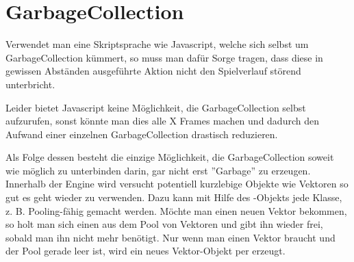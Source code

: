 \chapter{GarbageCollection}

Verwendet man eine Skriptsprache wie Javascript, welche sich selbst um GarbageCollection kümmert, so muss man dafür Sorge tragen, dass diese in gewissen Abständen ausgeführte Aktion nicht den Spielverlauf störend unterbricht.

Leider bietet Javascript keine Möglichkeit, die GarbageCollection selbst aufzurufen, sonst könnte man dies alle X Frames machen und dadurch den Aufwand einer einzelnen GarbageCollection drastisch reduzieren.

Als Folge dessen besteht die einzige Möglichkeit, die GarbageCollection soweit wie möglich zu unterbinden darin, gar nicht erst ''Garbage'' zu erzeugen. Innerhalb der Engine wird versucht potentiell kurzlebige Objekte wie Vektoren so gut es geht wieder zu verwenden. Dazu kann mit Hilfe des -Objekts jede Klasse, z. B.  Pooling-fähig gemacht werden. Möchte man einen neuen Vektor bekommen, so holt man sich einen aus dem Pool von Vektoren und gibt ihn wieder frei, sobald man ihn nicht mehr benötigt. Nur wenn man einen Vektor braucht und der Pool gerade leer ist, wird ein neues Vektor-Objekt per  erzeugt.